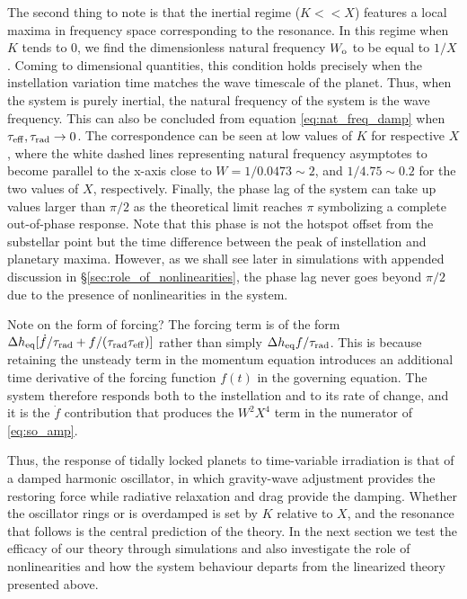 \documentclass[trackchanges,twocolumn]{aastex7}
\begin{document}
The second thing to note is that the inertial regime ($K << X$) features a local maxima in frequency space corresponding to the resonance. In this regime when $K$ tends to 0, we find the dimensionless natural frequency $W_{\rm o}$ to be equal to $1/X$. Coming to dimensional quantities, this condition holds precisely when the instellation variation time matches the wave timescale of the planet. Thus, when the system is purely inertial, the natural frequency of the system is the wave frequency. This can also be concluded from equation \eqref{eq:nat_freq_damp} when $\tau_{\rm eff}, \tau_{\rm rad} \to 0$. The correspondence can be seen at low values of $K$ for respective $X$, where the white dashed lines representing natural frequency asymptotes to become parallel to the x-axis close to $W=1/0.0473\sim2$, and $1/4.75\sim0.2$ for the two values of $X$, respectively. Finally, the phase lag of the system can take up values larger than $\pi/2$ as the theoretical limit reaches $\pi$ symbolizing a complete out-of-phase response. Note that this phase is not the hotspot offset from the substellar point but the time difference between the peak of instellation and planetary maxima. {\color{red} However, as we shall see later in simulations with appended discussion in \S \ref{sec:role_of_nonlinearities}, the phase lag never goes beyond $\pi/2$ due to the presence of nonlinearities in the system.}

{\color{teal} Note on the form of forcing? The forcing term is of the form $\Delta h_{\rm eq}[\dot{f}/\tau_{\rm rad} + f/(\tau_{\rm rad}\tau_{\rm eff})]$ rather than simply $\Delta h_{\rm eq} f/\tau_{\rm rad}$. This is because retaining the unsteady term in the momentum equation introduces an additional time derivative of the forcing function $f(t)$ in the governing equation. The system therefore responds both to the instellation and to its rate of change, and it is the $\dot{f}$ contribution that produces the $W^2X^4$ term in the numerator of \eqref{eq:so_amp}.}

Thus, the response of tidally locked planets to time-variable irradiation is that of a damped harmonic oscillator, in which gravity-wave adjustment provides the restoring force while radiative relaxation and drag provide the damping. Whether the oscillator rings or is overdamped is set by $K$ relative to $X$, and the resonance that follows is the central prediction of the theory. In the next section we test the efficacy of our theory through simulations and also investigate the role of nonlinearities and how the system behaviour departs from the linearized theory presented above.
\end{document}
